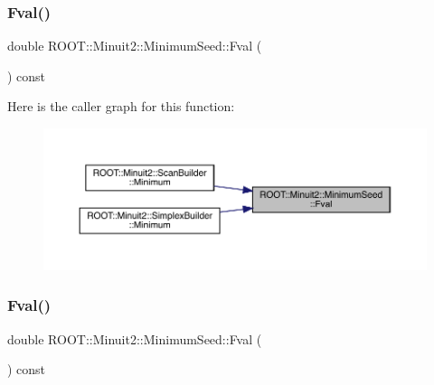 \mbox{\label{classROOT_1_1Minuit2_1_1MinimumSeed_a55c498b499c84f1a693729aa269db9aa}} 
\subsubsection{\texorpdfstring{Fval()}{Fval()}\hspace{0.1cm}{\footnotesize\ttfamily [1/3]}}
{\footnotesize\ttfamily double R\+O\+O\+T\+::\+Minuit2\+::\+Minimum\+Seed\+::\+Fval (\begin{DoxyParamCaption}{ }\end{DoxyParamCaption}) const\hspace{0.3cm}{\ttfamily [inline]}}

Here is the caller graph for this function\+:
\nopagebreak
\begin{figure}[H]
\begin{center}
\leavevmode
\includegraphics[width=350pt]{d1/d50/classROOT_1_1Minuit2_1_1MinimumSeed_a55c498b499c84f1a693729aa269db9aa_icgraph}
\end{center}
\end{figure}
\mbox{\label{classROOT_1_1Minuit2_1_1MinimumSeed_a55c498b499c84f1a693729aa269db9aa}} 
\subsubsection{\texorpdfstring{Fval()}{Fval()}\hspace{0.1cm}{\footnotesize\ttfamily [2/3]}}
{\footnotesize\ttfamily double R\+O\+O\+T\+::\+Minuit2\+::\+Minimum\+Seed\+::\+Fval (\begin{DoxyParamCaption}{ }\end{DoxyParamCaption}) const\hspace{0.3cm}{\ttfamily [inline]}}

